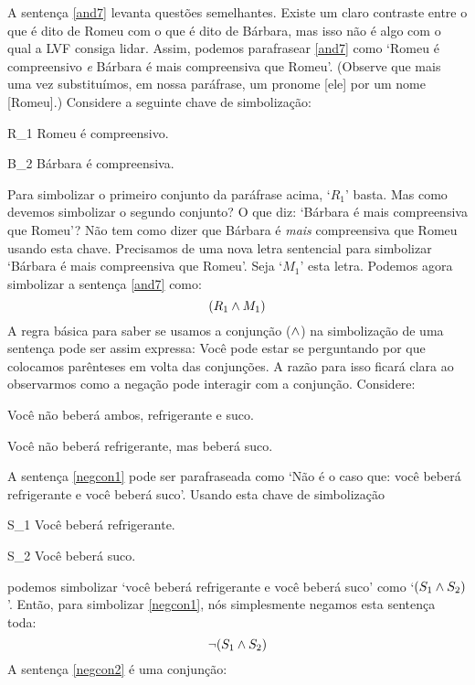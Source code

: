 A sentença \ref{and7} levanta questões semelhantes.
Existe um claro contraste entre o que é dito de Romeu com o que é dito de Bárbara, mas isso não é algo com o qual a LVF consiga lidar.
Assim, podemos parafrasear \ref{and7} como `Romeu é compreensivo \emph{e} Bárbara é mais compreensiva que Romeu'.
(Observe que mais uma vez substituímos, em nossa paráfrase, um pronome [ele] por um nome [Romeu].)
Considere a seguinte chave de simbolização:
	\begin{ekey}
		\item[R_1] Romeu é compreensivo.
		\item[B_2] Bárbara é compreensiva.
	\end{ekey}
Para simbolizar o primeiro conjunto da paráfrase acima, `$R_1$' basta.
Mas como devemos simbolizar o segundo conjunto? O que diz: `Bárbara é mais compreensiva que Romeu'?
Não tem como dizer que Bárbara é \emph{mais} compreensiva que Romeu usando esta chave.
Precisamos de uma nova letra sentencial para simbolizar `Bárbara é mais compreensiva que Romeu'. Seja `$M_1$' esta letra.
Podemos agora simbolizar a sentença \ref{and7} como:
$$(R_1 \wedge M_1)$$
A regra básica para saber se usamos a conjunção ($\wedge$) na simbolização de uma sentença pode ser assim expressa:
Você pode estar se perguntando por que colocamos parênteses em volta das conjunções.
A razão para isso ficará clara ao observarmos como a negação pode interagir com a conjunção.
Considere:
	\begin{earg}
		\item[\ex{negcon1}] Você não beberá ambos, refrigerante e suco.
		\item[\ex{negcon2}] Você não beberá refrigerante, mas beberá suco.
	\end{earg}
A sentença \ref{negcon1} pode ser parafraseada como `Não é o caso que: você beberá refrigerante e você beberá suco'.
Usando esta chave de simbolização
	\begin{ekey}
		\item[S_1] Você beberá refrigerante.
		\item[S_2] Você beberá suco.
	\end{ekey}
podemos simbolizar `você beberá refrigerante e você beberá suco' como `$(S_1 \wedge S_2)$'.
Então, para simbolizar \ref{negcon1}, nós simplesmente negamos esta sentença toda:
$$\neg(S_1 \wedge S_2)$$
A sentença \ref{negcon2} é uma conjunção:
